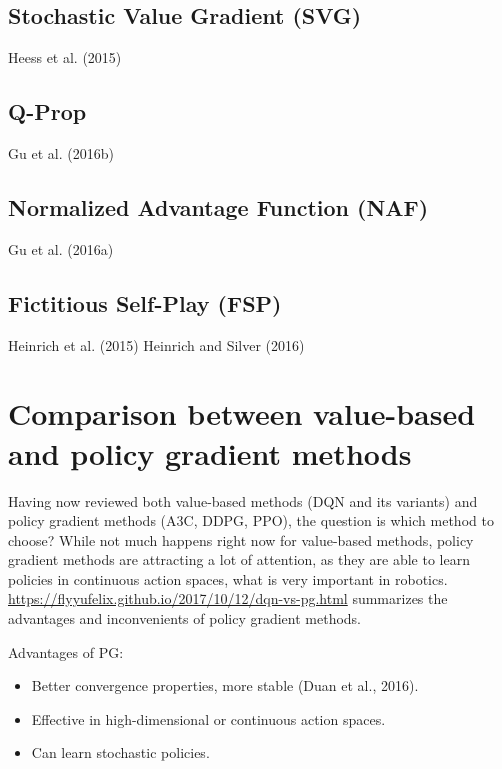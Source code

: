 \documentclass[
  letterpaper,
  DIV=11,
  numbers=noendperiod]{scrreprt}
\providecommand{\tightlist}{%
  \setlength{\itemsep}{0pt}\setlength{\parskip}{0pt}}\usepackage{longtable,booktabs,array}
\begin{document}
\hypertarget{stochastic-value-gradient-svg}{%
\subsection{Stochastic Value Gradient
(SVG)}\label{stochastic-value-gradient-svg}}

Heess et al. (2015)

\hypertarget{q-prop}{%
\subsection{Q-Prop}\label{q-prop}}

Gu et al. (2016b)

\hypertarget{normalized-advantage-function-naf}{%
\subsection{Normalized Advantage Function
(NAF)}\label{normalized-advantage-function-naf}}

Gu et al. (2016a)

\hypertarget{fictitious-self-play-fsp}{%
\subsection{Fictitious Self-Play (FSP)}\label{fictitious-self-play-fsp}}

Heinrich et al. (2015) Heinrich and Silver (2016)

\hypertarget{comparison-between-value-based-and-policy-gradient-methods}{%
\section{Comparison between value-based and policy gradient
methods}\label{comparison-between-value-based-and-policy-gradient-methods}}

Having now reviewed both value-based methods (DQN and its variants) and
policy gradient methods (A3C, DDPG, PPO), the question is which method
to choose? While not much happens right now for value-based methods,
policy gradient methods are attracting a lot of attention, as they are
able to learn policies in continuous action spaces, what is very
important in robotics.
\url{https://flyyufelix.github.io/2017/10/12/dqn-vs-pg.html} summarizes
the advantages and inconvenients of policy gradient methods.

Advantages of PG:

\begin{itemize}
\tightlist
\item
  Better convergence properties, more stable (Duan et al., 2016).
\item
  Effective in high-dimensional or continuous action spaces.
\item
  Can learn stochastic policies.
\end{itemize}
\end{document}
